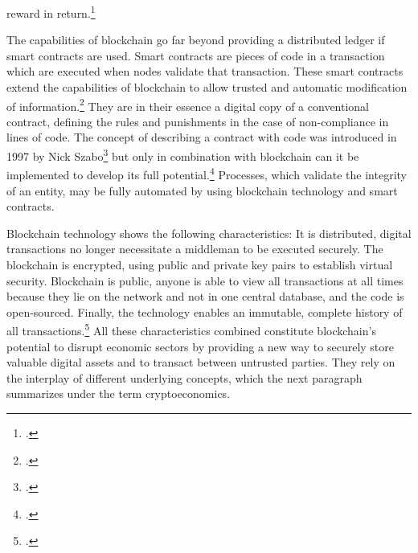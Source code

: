 reward in return.\footcites[Cf.][p.12]{CataliniSimpleEconomicsBlockchain2017}[cf.][p.5 et seqq]{DavidsonEconomicsBlockchain2016}   



The capabilities of blockchain go far beyond providing a distributed ledger if smart contracts are used. Smart contracts are pieces of code in a transaction which are executed when nodes validate that transaction. These smart contracts extend the capabilities of blockchain to allow trusted and automatic modification of information.\footcite[Cf.][p.14]{Schutte.2017} They are in their essence a digital copy of a conventional contract, defining the rules and punishments in the case of non-compliance in lines of code. The concept of describing a contract with code was introduced in 1997 by Nick Szabo\footcite[][]{Szabo.1997} but only in combination with blockchain can it be implemented to develop its full potential.\footcites[Cf.][p.23]{Schlatt.2016}[cf.][p.22-24]{GOV.2016} Processes, which validate the integrity of an entity, may be fully automated by using blockchain technology and smart contracts.

Blockchain technology shows the following characteristics: It is distributed, digital transactions no longer necessitate a middleman to be executed securely. The blockchain is encrypted, using public and private key pairs to establish virtual security. Blockchain is public, anyone is able to view all transactions at all times because they lie on the network and not in one central database, and the code is open-sourced. Finally, the technology enables an immutable, complete history of all transactions.\footcite[Cf.][p.5]{Tapscott.2017} All these characteristics combined constitute blockchain's potential to disrupt economic sectors by providing a new way to securely store valuable digital assets and to transact between untrusted parties. They rely on the interplay of different underlying concepts, which the next paragraph summarizes under the term cryptoeconomics.

